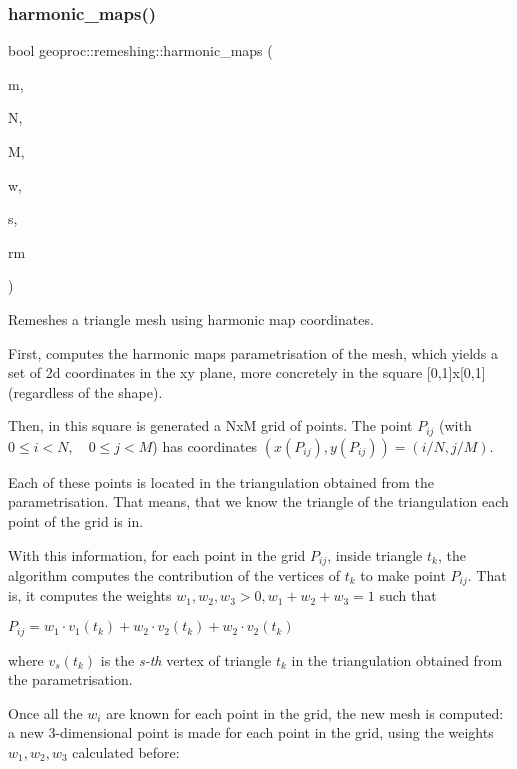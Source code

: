 \subsubsection{\texorpdfstring{harmonic\+\_\+maps()}{harmonic\_maps()}}
{\footnotesize\ttfamily bool geoproc\+::remeshing\+::harmonic\+\_\+maps (\begin{DoxyParamCaption}\item[{const \hyperlink{classgeoproc_1_1TriangleMesh}{Triangle\+Mesh} \&}]{m,  }\item[{size\+\_\+t}]{N,  }\item[{size\+\_\+t}]{M,  }\item[{const \hyperlink{namespacegeoproc_1_1smoothing_a76e43f405426c150569712512de58028}{smoothing\+::smooth\+\_\+weight} \&}]{w,  }\item[{const \hyperlink{namespacegeoproc_1_1parametrisation_a7f001bf497830114e8aea2c884a948b7}{parametrisation\+::boundary\+\_\+shape} \&}]{s,  }\item[{\hyperlink{classgeoproc_1_1TriangleMesh}{Triangle\+Mesh} \&}]{rm }\end{DoxyParamCaption})}



Remeshes a triangle mesh using harmonic map coordinates. 

First, computes the harmonic maps parametrisation of the mesh, which yields a set of 2d coordinates in the xy plane, more concretely in the square \mbox{[}0,1\mbox{]}x\mbox{[}0,1\mbox{]} (regardless of the shape).

Then, in this square is generated a NxM grid of points. The point $P_{ij}$ (with $0\le i < N, \quad 0\le j < M$) has coordinates $(x(P_{ij}), y(P_{ij})) = (i/N, j/M)$.

Each of these points is located in the triangulation obtained from the parametrisation. That means, that we know the triangle of the triangulation each point of the grid is in.

With this information, for each point in the grid $P_{ij}$, inside triangle $t_k$, the algorithm computes the contribution of the vertices of $t_k$ to make point $P_{ij}$. That is, it computes the weights $w_1,w_2,w_3 > 0, w_1 + w_2 + w_3 = 1$ such that

$ P_{ij} = w_1 \cdot v_1(t_k) + w_2 \cdot v_2(t_k) + w_2 \cdot v_2(t_k) $

where $v_s(t_k)$ is the {\itshape s-\/th} vertex of triangle $t_k$ in the triangulation obtained from the parametrisation.

Once all the $w_i$ are known for each point in the grid, the new mesh is computed\+: a new 3-\/dimensional point is made for each point in the grid, using the weights $w_1,w_2,w_3$ calculated before\+:


